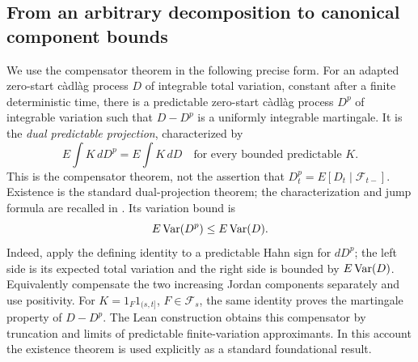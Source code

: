 \subsection{From an arbitrary decomposition to canonical component bounds}
\label{sec:canonical-cost}
We use the compensator theorem in the following precise form.
For an adapted zero-start c\`adl\`ag process $D$ of integrable total variation,
constant after a finite deterministic time, there is a predictable zero-start
c\`adl\`ag process $D^p$ of integrable variation such that $D-D^p$ is a
uniformly integrable martingale. It is the \emph{dual predictable projection},
characterized by
\[
 E\int K\,dD^p=E\int K\,dD
 \quad\text{for every bounded predictable }K.
\]
This is the compensator theorem, not the assertion that
$D^p_t=E[D_t\mid\mathcal F_{t-}]$.
Existence is the standard dual-projection theorem; the characterization and
jump formula are recalled in \cite[Section 4.3]{Nikeghbali}.
Its variation bound is
\begin{equation}\label{eq:compensator-variation}
 E\operatorname{Var}(D^p)\leq E\operatorname{Var}(D).
\end{equation}
Indeed, apply the defining identity to a predictable Hahn sign for $dD^p$;
the left side is its expected total variation and the right side is bounded
by $E\operatorname{Var}(D)$. Equivalently compensate the two increasing Jordan components
separately and use positivity. For $K=1_F1_{(s,t]}$, $F\in\mathcal F_s$,
the same identity proves the martingale property of $D-D^p$.
The Lean construction obtains this compensator by truncation and limits of
predictable finite-variation approximants. In this account the existence
theorem is used explicitly as a standard foundational result.

